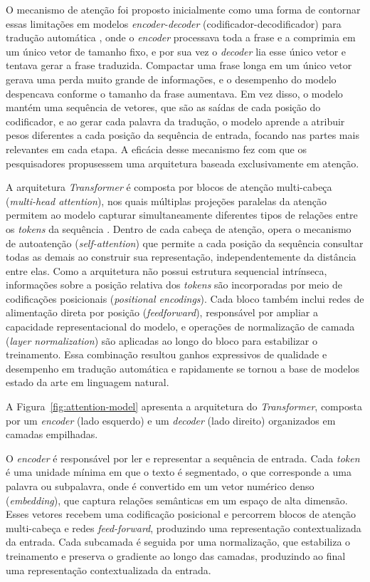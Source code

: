O mecanismo de atenção foi proposto inicialmente como uma forma de contornar
essas limitações em modelos \textit{encoder-decoder} (codificador-decodificador)
para tradução automática \cite{bahdanau2015}, onde o \textit{encoder} processava
toda a frase e a comprimia em um único vetor de tamanho fixo, e por sua vez o
\textit{decoder} lia esse único vetor e tentava gerar a frase traduzida.
Compactar uma frase longa em um único vetor gerava uma perda muito grande de
informações, e o desempenho do modelo despencava conforme o tamanho da frase
aumentava. Em vez disso, o modelo mantém uma sequência de vetores, que são as saídas
de cada posição do codificador, e ao gerar cada palavra da tradução, o modelo aprende a atribuir pesos diferentes a cada posição da sequência de entrada, focando nas partes mais relevantes em cada etapa. A eficácia desse mecanismo fez com que os
pesquisadores propusessem uma arquitetura baseada exclusivamente em atenção.
 
A arquitetura \textit{Transformer} é composta por blocos de atenção multi-cabeça (\textit{multi-head attention}), nos quais múltiplas projeções paralelas da atenção permitem ao modelo capturar simultaneamente diferentes tipos de relações entre os \textit{tokens} da sequência \cite{GoogleTeamTransformers}. Dentro de cada cabeça de atenção, opera o mecanismo de autoatenção (\textit{self-attention}) que permite a cada posição da sequência consultar todas as demais ao construir sua representação, independentemente da distância entre elas. Como a arquitetura não possui estrutura sequencial intrínseca, informações sobre a posição relativa dos \textit{tokens} são incorporadas por meio de codificações posicionais (\textit{positional encodings}). Cada bloco também inclui redes de alimentação direta por posição (\textit{feedforward}), responsável por ampliar a capacidade representacional do modelo, e operações de normalização de camada (\textit{layer normalization}) são aplicadas ao longo do bloco para estabilizar o treinamento. Essa combinação resultou ganhos expressivos de qualidade e desempenho em tradução automática e rapidamente se tornou a base de modelos estado da arte em linguagem natural.

A Figura~\ref{fig:attention-model} apresenta a arquitetura do \textit{Transformer}, composta por um \textit{encoder} (lado esquerdo) e um \textit{decoder} (lado direito) organizados em camadas empilhadas. 

O \textit{encoder} é responsável por ler e representar a sequência de entrada. Cada \textit{token} é uma unidade mínima em que o texto é segmentado, o que corresponde a uma palavra ou subpalavra, onde é convertido em um vetor numérico denso (\textit{embedding}), que captura relações semânticas em um espaço de alta dimensão. Esses vetores recebem uma codificação posicional e percorrem blocos de atenção multi-cabeça e redes \textit{feed-forward}, produzindo uma representação contextualizada da entrada. Cada subcamada é seguida por uma normalização, que estabiliza o treinamento e preserva o gradiente ao longo das camadas, produzindo ao final uma representação contextualizada da entrada. 

